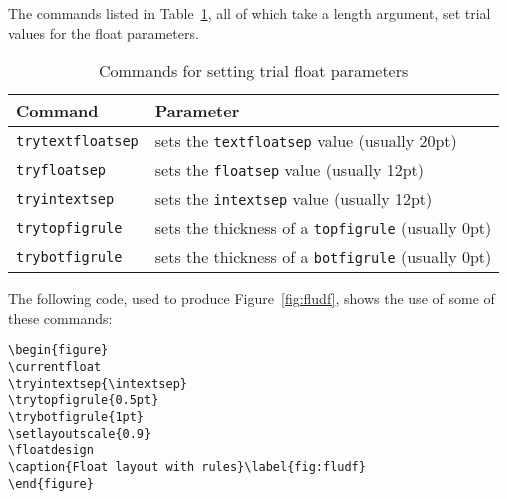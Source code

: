 \documentclass[11pt]{article}
\makeatletter
\newcommand{\fref}[1]{Figure~\ref{#1}}
\newcommand{\tref}[1]{Table~\ref{#1}}
\newcommand{\pixcom}[1]{\texttt{\bs #1}\index{#1/ @\texttt{\protect\bs #1}}}
\makeatother
\begin{document}
    The commands listed in \tref{tab:tfloat}, all of which take a length
argument, set trial values for the float parameters.

\begin{table}
\centering
\caption{Commands for setting trial float parameters}\label{tab:tfloat}
\begin{tabular}{|l|l|} \hline
Command & Parameter \\ \hline
\pixcom{trytextfloatsep} & sets the \pixcom{textfloatsep} value (usually 20pt) \\
\pixcom{tryfloatsep} & sets the \pixcom{floatsep} value (usually 12pt) \\
\pixcom{tryintextsep} & sets the \pixcom{intextsep} value (usually 12pt) \\
\pixcom{trytopfigrule} & sets the thickness of a \pixcom{topfigrule} (usually 0pt) \\
\pixcom{trybotfigrule} & sets the thickness of a \pixcom{botfigrule} (usually 0pt) \\
\hline
\end{tabular}
\end{table}

    The following code, used to produce \fref{fig:fludf}, shows the use of
some of these commands:
\begin{verbatim}
\begin{figure}
\currentfloat
\tryintextsep{\intextsep}
\trytopfigrule{0.5pt}
\trybotfigrule{1pt}
\setlayoutscale{0.9}
\floatdesign
\caption{Float layout with rules}\label{fig:fludf}
\end{figure}
\end{verbatim}
\end{document}
